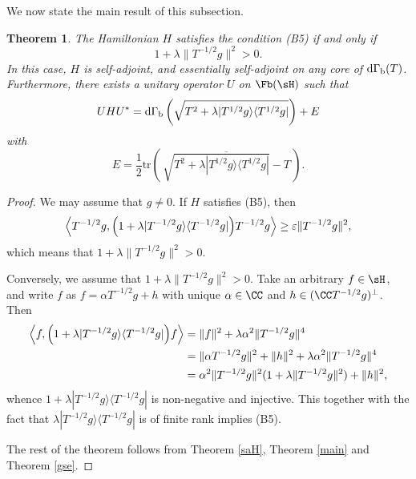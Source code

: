 \documentclass[12pt]{article}
\theoremstyle{plain}
\newtheorem{theorem}{Theorem}[section]
\numberwithin{equation}{section}
\theoremstyle{remark}
\begin{document}
We now state the main result of this subsection.

\begin{theorem}\label{diagonalization of SPIM}
The Hamiltonian $H$ satisfies the condition (B5) if and only if 
\[
1+\lambda\|T^{-1/2}g\|^2>0.
\]
In this case, $H$ is self-adjoint, and essentially self-adjoint on any core of ${\rm d}\Gamma_{\rm b}(T)$.
Furthermore, there exists a unitary operator $U$ on $\Fb(\sH)$ such that 
\[
UHU^*={\rm d}\Gamma_{\rm b}\left(\sqrt{T^2+\lambda|T^{1/2}g\rangle\langle T^{1/2}g|}\right) + E
\]
with
\[
E=\frac{1}{2}\mathrm{tr}\left(\,\overline{\sqrt{T^2+\lambda|T^{1/2}g\rangle\langle T^{1/2}g|}-T}\,\right).
\]
\end{theorem}

\begin{proof}
We may assume that $g\not=0$.
If $H$ satisfies (B5), then 
\[
\left\langle T^{-1/2}g, \Bigl(1+\lambda|T^{-1/2}g\rangle\langle T^{-1/2}g|\Bigr) T^{-1/2}g\right\rangle
\geq \varepsilon\|T^{-1/2}g\|^2,
\]
which means that $1+\lambda\|T^{-1/2}g\|^2>0$.

Conversely, we assume that $1+\lambda\|T^{-1/2}g\|^2>0$.
Take an arbitrary $f\in\sH$, and write $f$ as $f=\alpha T^{-1/2}g+h$ with unique $\alpha\in\CC$ and $h\in (\CC T^{-1/2}g)^{\perp}$.
Then
\begin{align*}
\left\langle f, \Bigl(1+\lambda|T^{-1/2}g\rangle\langle T^{-1/2}g|\Bigr) f\right\rangle
&= \|f\|^2+\lambda\alpha^2\|T^{-1/2}g\|^4\\
&= \|\alpha T^{-1/2}g\|^2+\|h\|^2+\lambda\alpha^2\|T^{-1/2}g\|^4\\
&= \alpha^2\|T^{-1/2}g\|^2(1+\lambda\|T^{-1/2}g\|^2)+\|h\|^2,
\end{align*}
whence $1+\lambda|T^{-1/2}g\rangle\langle T^{-1/2}g|$ is non-negative and injective.
This together with the fact that $\lambda|T^{-1/2}g\rangle\langle T^{-1/2}g|$ is of finite rank implies (B5).

The rest of the theorem follows from Theorem \ref{saH}, Theorem \ref{main} and Theorem \ref{gse}.
\end{proof}
\end{document}
